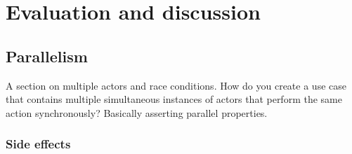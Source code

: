 \chapter{Evaluation and discussion}

\section{Parallelism}
A section on multiple actors and race conditions. How do you create a use case that contains multiple simultaneous instances of actors that perform the same action synchronously? Basically asserting parallel properties.

\subsection{Side effects}

